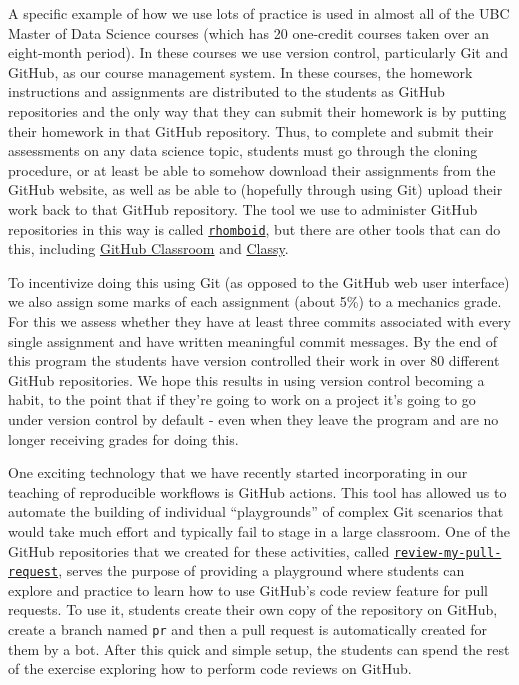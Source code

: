 \documentclass[
  12 pt,
]{paper}
\begin{document}
A specific example of how we use lots of practice
is used in almost all of the UBC Master of Data Science courses
(which has 20 one-credit courses taken over an eight-month period).
In these courses we use version control,
particularly Git and GitHub, as our course management system.
In these courses, the homework instructions and assignments are distributed
to the students as GitHub repositories and the only way that they can submit
their homework is by putting their homework in that GitHub repository.
Thus, to complete and submit their assessments
on any data science topic, students must go through the cloning procedure,
or at least be able to somehow download their assignments from the
GitHub website, as well as be able to
(hopefully through using Git) upload their work back to that GitHub
repository. The tool we use to administer GitHub repositories in this way
is called \href{https://github.com/mgelbart/rhomboid}{\texttt{rhomboid}},
but there are other tools that can do this,
including \href{https://classroom.github.com/}{GitHub Classroom}
and \href{https://github.com/ubccpsc/classy}{Classy}.

To incentivize doing this using Git
(as opposed to the GitHub web user interface)
we also assign some marks of each assignment (about 5\%) to a mechanics grade.
For this we assess whether they have at least three
commits associated with every single assignment
and have written meaningful commit messages.
By the end of this program the students have version controlled their
work in over 80 different GitHub repositories.
We hope this results in using version control becoming a habit,
to the point that if they're going to work on a project
it's going to go under version control by default -
even when they leave the program
and are no longer receiving grades for doing this.

One exciting technology that we have recently started incorporating
in our teaching of reproducible workflows is GitHub actions.
This tool has allowed us
to automate the building of individual ``playgrounds'' of complex Git scenarios
that would take much effort and typically fail to stage in a large classroom.
One of the GitHub repositories that we created for these activities, called
\href{https://github.com/ttimbers/review-my-pull-request}{\texttt{review-my-pull-request}},
serves the purpose of providing a playground
where students can explore and practice
to learn how to use GitHub's code review feature for pull requests.
To use it,
students create their own copy of the repository on GitHub,
create a branch named \texttt{pr}
and then a pull request is automatically created for them by a bot.
After this quick and simple setup,
the students can spend the rest of the exercise
exploring how to perform code reviews on GitHub.
\end{document}

